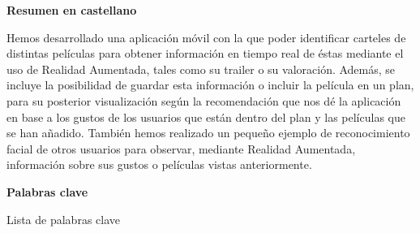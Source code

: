 
\newpage

\thispagestyle{empty}

\begin{center}

{\bf \Huge Resumen en castellano}

  \end{center}
\vspace{1cm}

Hemos desarrollado una aplicación móvil con la que poder identificar
carteles de distintas películas para obtener información en tiempo real de
éstas mediante el uso de Realidad Aumentada, tales como su trailer o su valoración. Además,
se incluye la posibilidad de guardar esta información o incluir la película en un plan, para 
su posterior visualización según la recomendación que nos dé la aplicación en base a 
los gustos de los usuarios que están dentro del plan y las películas que se han añadido. 
También hemos realizado un pequeño ejemplo de reconocimiento facial de otros usuarios para observar, 
mediante Realidad Aumentada, información sobre sus gustos o películas vistas anteriormente.

\vspace{1cm}


\begin{center}

{\bf \Large Palabras clave}

   \end{center}

   \vspace{0.5cm}
   
   Lista de palabras clave
   


